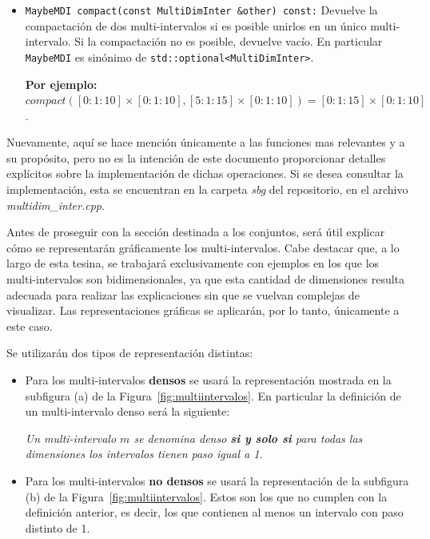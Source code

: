 \begin{itemize}
    \item \texttt{MaybeMDI compact(const MultiDimInter \&other) const:}  
    Devuelve la compactación de dos multi-intervalos si es posible unirlos en un único multi-intervalo. Si la compactación no es posible, devuelve vacío. En particular \texttt{MaybeMDI} es sinónimo de \texttt{std::optional<MultiDimInter>}.

    \begin{center}
        \textbf{Por ejemplo:} $compact([0: 1: 10] \times [0: 1: 10], [5: 1: 15] \times [0: 1: 10])=[0: 1: 15] \times [0: 1: 10]$.
    \end{center}

\end{itemize}

Nuevamente, aquí se hace mención únicamente a las funciones mas relevantes y a su propósito, pero no es la intención de este documento proporcionar detalles explícitos sobre la implementación de dichas operaciones. Si se desea consultar la implementación, esta se encuentran en la carpeta \textit{sbg} del repositorio, en el archivo \textit{multidim\_inter.cpp}.

Antes de proseguir con la sección destinada a los conjuntos, será útil explicar cómo se representarán gráficamente los multi-intervalos. Cabe destacar que, a lo largo de esta tesina, se trabajará exclusivamente con ejemplos en los que los multi-intervalos son bidimensionales, ya que esta cantidad de dimensiones resulta adecuada para realizar las explicaciones sin que se vuelvan complejas de visualizar. Las representaciones gráficas se aplicarán, por lo tanto, únicamente a este caso.

Se utilizarán dos tipos de representación distintas:

\begin{itemize}
    \item Para los multi-intervalos \textbf{densos} se usará la representación mostrada en la subfigura (a) de la Figura~\ref{fig:multiintervalos}. En particular la definición de un multi-intervalo denso será la siguiente:

    \begin{center}
        \textit{Un multi-intervalo $m$ se denomina denso \textbf{si y solo si} para todas las dimensiones los intervalos tienen paso igual a 1.}
    \end{center}

    \item Para los multi-intervalos \textbf{no densos} se usará la representación de la subfigura (b) de la Figura~\ref{fig:multiintervalos}. Estos son los que no cumplen con la definición anterior, es decir, los que contienen al menos un intervalo con paso distinto de 1.
\end{itemize}

